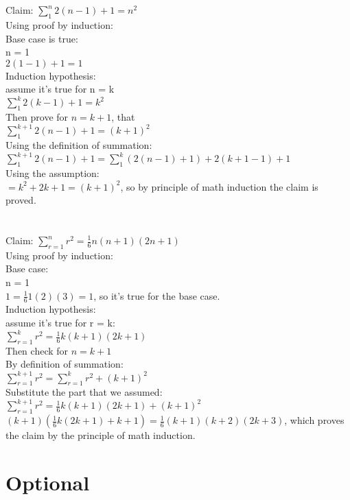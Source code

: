 \documentclass{article}
\begin{document}
\section{}
Claim: $\sum_{1}^n2(n-1)+1 = n^2$\\
Using proof by induction:\\
Base case is true:\\
n = 1\\
$2(1-1) + 1 = 1$\\
Induction hypothesis:\\
assume it's true for n = k\\
$\sum_{1}^k2(k-1) + 1 = k^2$\\
Then prove for $n = k + 1$, that\\
$\sum_{1}^{k+1}2(n-1) + 1 = (k+1)^2$\\
Using the definition of summation:\\
$\sum_{1}^{k+1}2(n-1) + 1 = \sum_{1}^{k}(2(n-1) + 1) + 2(k+1 -1) +1 $\\
Using the assumption:\\
$= k^2 + 2k + 1 = (k + 1)^2$, so by principle of math induction the claim is proved.

\section{}
Claim: $\sum_{r=1}^nr^2 = \frac{1}{6}n(n+1)(2n+1)$\\
Using proof by induction:\\
Base case:\\
n = 1\\
$1 = \frac{1}{6}1(2)(3) = 1$, so it's true for the base case.\\
Induction hypothesis:\\
assume it's true for r = k:\\
$\sum_{r=1}^kr^2 = \frac{1}{6}k(k+1)(2k+1)$\\
Then check for $n = k + 1$\\
By definition of summation:\\
$\sum_{r=1}^{k+1}r^2 = \sum_{r=1}^kr^2 + (k+1)^2$\\
Substitute the part that we assumed:\\
$\sum_{r=1}^{k+1}r^2 = \frac{1}{6}k(k+1)(2k+1) + (k+1)^2$\\
$(k+1)(\frac{1}{6}k(2k+1) + k+1) = \frac{1}{6}(k+1)(k+2)(2k+3)$, which proves the claim by the principle of math induction.\\

\section*{Optional}
\end{document}

